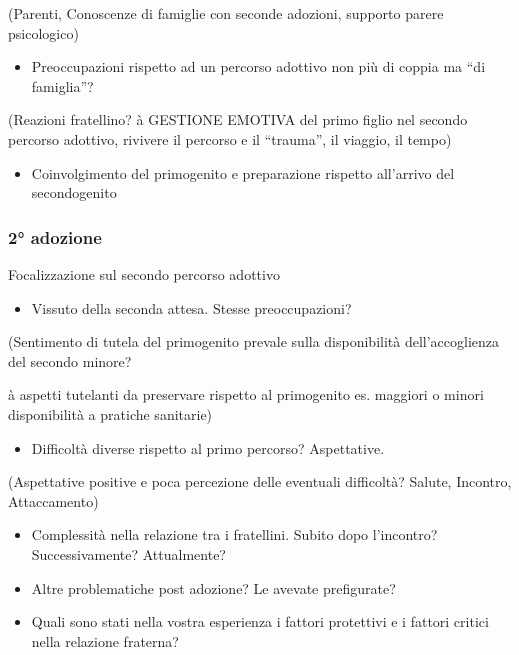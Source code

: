 \documentclass[12pt,oneside,svgnames]{memoir}
\begin{document}
(Parenti, Conoscenze di famiglie con seconde adozioni, supporto parere
psicologico)

\begin{itemize}
\itemsep1pt\parskip0pt
\item
  Preoccupazioni rispetto ad un percorso adottivo non più di coppia ma
  ``di famiglia''?
\end{itemize}

(Reazioni fratellino? à GESTIONE EMOTIVA del primo figlio nel secondo
percorso adottivo, rivivere il percorso e il ``trauma'', il viaggio, il
tempo)

\begin{itemize}
\itemsep1pt\parskip0pt
\item
  Coinvolgimento del primogenito e preparazione rispetto all'arrivo del
  secondogenito
\end{itemize}

\subsubsection*{2° adozione}\label{adozione-1}

Focalizzazione sul secondo percorso adottivo

\begin{itemize}
\itemsep1pt\parskip0pt
\item
  Vissuto della seconda attesa. Stesse preoccupazioni?
\end{itemize}

(Sentimento di tutela del primogenito prevale sulla disponibilità
dell'accoglienza del secondo minore?

à aspetti tutelanti da preservare rispetto al primogenito es. maggiori o
minori disponibilità a pratiche sanitarie)

\begin{itemize}
\itemsep1pt\parskip0pt
\item
  Difficoltà diverse rispetto al primo percorso? Aspettative.
\end{itemize}

(Aspettative positive e poca percezione delle eventuali difficoltà?
Salute, Incontro, Attaccamento)

\begin{itemize}
\item
  Complessità nella relazione tra i fratellini. Subito dopo l'incontro?
  Successivamente? Attualmente?
\item
  Altre problematiche post adozione? Le avevate prefigurate?
\item
  Quali sono stati nella vostra esperienza i fattori protettivi e i
  fattori critici nella relazione fraterna?
\end{itemize}
\end{document}

